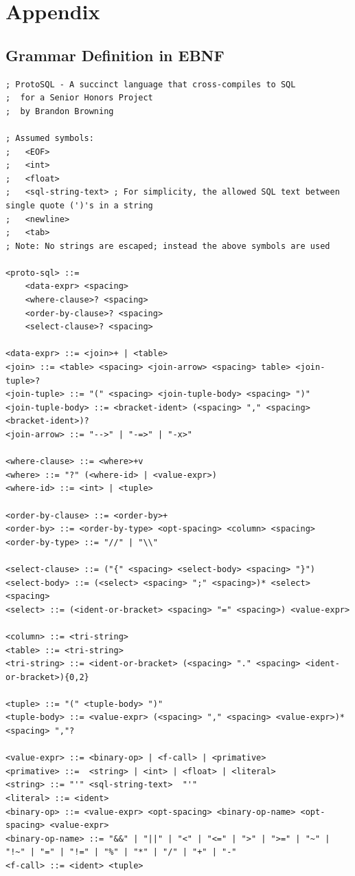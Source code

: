 \documentclass[titlepage]{article}
\begin{document}
	\section{Appendix}

		\subsection{Grammar Definition in EBNF}

\begin{lstlisting}
; ProtoSQL - A succinct language that cross-compiles to SQL
;  for a Senior Honors Project
;  by Brandon Browning

; Assumed symbols:
;   <EOF>
;   <int>
;   <float>
;   <sql-string-text> ; For simplicity, the allowed SQL text between single quote (')'s in a string
;   <newline>
;   <tab>
; Note: No strings are escaped; instead the above symbols are used

<proto-sql> ::= 
	<data-expr> <spacing>
	<where-clause>? <spacing>
	<order-by-clause>? <spacing>
	<select-clause>? <spacing>

<data-expr> ::= <join>+ | <table>
<join> ::= <table> <spacing> <join-arrow> <spacing> table> <join-tuple>?
<join-tuple> ::= "(" <spacing> <join-tuple-body> <spacing> ")"
<join-tuple-body> ::= <bracket-ident> (<spacing> "," <spacing> <bracket-ident>)?
<join-arrow> ::= "-->" | "-=>" | "-x>"

<where-clause> ::= <where>+v
<where> ::= "?" (<where-id> | <value-expr>)
<where-id> ::= <int> | <tuple>

<order-by-clause> ::= <order-by>+
<order-by> ::= <order-by-type> <opt-spacing> <column> <spacing>
<order-by-type> ::= "//" | "\\"

<select-clause> ::= ("{" <spacing> <select-body> <spacing> "}")
<select-body> ::= (<select> <spacing> ";" <spacing>)* <select> <spacing>
<select> ::= (<ident-or-bracket> <spacing> "=" <spacing>) <value-expr>

<column> ::= <tri-string>
<table> ::= <tri-string>
<tri-string> ::= <ident-or-bracket> (<spacing> "." <spacing> <ident-or-bracket>){0,2}

<tuple> ::= "(" <tuple-body> ")"
<tuple-body> ::= <value-expr> (<spacing> "," <spacing> <value-expr>)* <spacing> ","?

<value-expr> ::= <binary-op> | <f-call> | <primative>
<primative> ::=  <string> | <int> | <float> | <literal>
<string> ::= "'" <sql-string-text>  "'"
<literal> ::= <ident>
<binary-op> ::= <value-expr> <opt-spacing> <binary-op-name> <opt-spacing> <value-expr>
<binary-op-name> ::= "&&" | "||" | "<" | "<=" | ">" | ">=" | "~" | "!~" | "=" | "!=" | "%" | "*" | "/" | "+" | "-"
<f-call> ::= <ident> <tuple>


\end{lstlisting}
\end{document}
